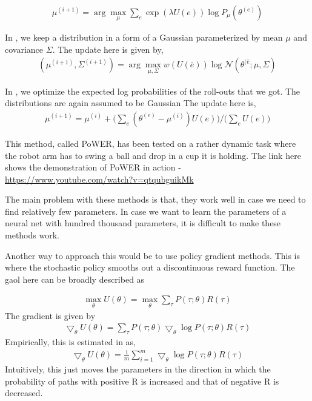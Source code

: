 \documentclass[11pt]{article}
\begin{document}
\begin{align}
\mu^{(i+1)} = \arg \max_{\mu} \sum_e \exp(\lambda U(e)) \log{P_\mu(\theta^{(e)})}
\end{align}

In \cite{cmaes}, we keep a distribution in a form of a Gaussian  parameterized by mean $\mu$ and covariance $\Sigma$. The update here is given by,
\begin{align}
(\mu^{(i+1)}, \Sigma^{(i+1)}) = \arg \max_{\mu,\Sigma }w(U(\bar{e}))\log{\mathcal{N}(\theta^{(\bar{e}};\mu,\Sigma)}
\end{align}

In \cite{power}, we optimize the expected log probabilities of the roll-outs that we got. The distributions are again assumed to be Gaussian The update here is,
\begin{align}
\mu^{(i+1)} = \mu^{(i)} + \Big(\sum_e(\theta^{(e)}-\mu^{(i)})U(e)\Big)/ \Big( \sum_e U(e) \Big)
\end{align}

This method, called PoWER, has been tested on a rather dynamic task where the robot arm has to swing a ball and drop in a cup it is holding. The link here shows the demonstration of PoWER in action - \url{https://www.youtube.com/watch?v=qtqubguikMk}

The main problem with these methods is that, they work well in case we need to find relatively few parameters. In case we want to learn the parameters of a neural net with hundred thousand parameters, it is difficult to make these methods work. 

Another way to approach this would be to use policy gradient methods. This is where the stochastic policy smooths out a discontinuous reward function. The gaol here can be broadly described as 

\begin{align}
\max_{\theta}U(\theta) = \max_{\theta }\sum_{\tau{}}P(\tau{} ;\theta)R(\tau{})
\end{align}
The gradient is given by 
\begin{align}
\bigtriangledown_\theta U(\theta) = \sum_\tau P(\tau;\theta) \bigtriangledown_\theta \log{P(\tau;\theta)} R(\tau)
\end{align}
Empirically, this is estimated in \cite{gpomdp} as,
\begin{align}
\bigtriangledown_\theta U(\theta) = \frac{1}{m}\sum_{i=1}^m \bigtriangledown_\theta \log{P(\tau;\theta)} R(\tau)
\end{align}
Intuitively, this just moves the parameters in the direction in which the probability of paths with positive R is increased and that of negative R is decreased.  
\end{document}
